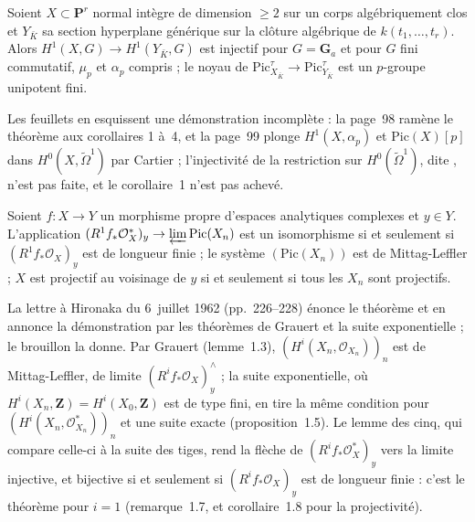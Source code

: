 \begin{encadre}
\begin{theoreme*}\nonverifie
Soient $X \subset \mathbf P^r$ normal intègre de dimension $\geq 2$ sur un corps algébriquement clos et $Y_{\bar K}$ sa section hyperplane générique sur la clôture algébrique de $k(t_1, \ldots, t_r)$. Alors $H^1(X, G) \to H^1(Y_{\bar K}, G)$ est injectif pour $G = \mathbf G_a$ et pour $G$ fini commutatif, $\mu_p$ et $\alpha_p$ compris ; le noyau de $\mathrm{Pic}^\tau_{X_{\bar K}} \to \mathrm{Pic}^\tau_{Y_{\bar K}}$ est un $p$-groupe unipotent fini.
\end{theoreme*}
\end{encadre}
{\small Les feuillets en esquissent une démonstration incomplète : la page~98 ramène le théorème aux corollaires 1 à~4, et la page~99 plonge $H^1(X, \alpha_p)$ et $\mathrm{Pic}(X)[p]$ dans $H^0(X, \tilde\Omega^1)$ par Cartier ; l'injectivité de la restriction sur $H^0(\tilde\Omega^1)$, dite , n'est pas faite, et le corollaire~1 n'est pas achevé.\par}

\begin{encadre}
\begin{theoreme*}\nonverifie
Soient $f : X \to Y$ un morphisme propre d'espaces analytiques complexes et $y \in Y$. L'application $(R^1f_*\mathcal O^*_X)_y \to \varprojlim \mathrm{Pic}(X_n)$ est un isomorphisme si et seulement si $(R^1f_*\mathcal O_X)_y$ est de longueur finie ; le système $(\mathrm{Pic}(X_n))$ est de Mittag-Leffler ; $X$ est projectif au voisinage de $y$ si et seulement si tous les $X_n$ sont projectifs.
\end{theoreme*}
\end{encadre}
\begin{demopage}[pages 226 à 228 et 247 à 261]
La lettre à Hironaka du 6~juillet 1962 (pp.~226--228) énonce le théorème et en annonce la démonstration par les théorèmes de Grauert et la suite exponentielle ; le brouillon la donne. Par Grauert (lemme~1.3), $(H^i(X_n, \mathcal O_{X_n}))_n$ est de Mittag-Leffler, de limite $(R^if_*\mathcal O_X)^\wedge_y$ ; la suite exponentielle, où $H^i(X_n, \mathbf Z) = H^i(X_0, \mathbf Z)$ est de type fini, en tire la même condition pour $(H^i(X_n, \mathcal O^*_{X_n}))_n$ et une suite exacte (proposition~1.5). Le lemme des cinq, qui compare celle-ci à la suite des tiges, rend la flèche de $(R^if_*\mathcal O^*_X)_y$ vers la limite injective, et bijective si et seulement si $(R^if_*\mathcal O_X)_y$ est de longueur finie : c'est le théorème pour $i = 1$ (remarque~1.7, et corollaire~1.8 pour la projectivité).
\end{demopage}

